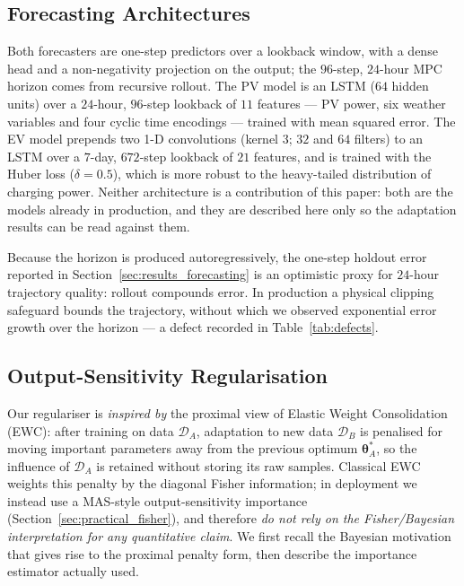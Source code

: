 \documentclass[journal]{IEEEtran}
\newcommand{\params}{\bm{\theta}}
\begin{document}
\subsection{Forecasting Architectures}
\label{sec:architectures}
Both forecasters are one-step predictors over a lookback window, with a dense
head and a non-negativity projection on the output; the $96$-step, $24$-hour
MPC horizon comes from recursive rollout. The PV model is an LSTM ($64$ hidden
units) over a $24$-hour, $96$-step lookback of $11$ features --- PV power, six
weather variables and four cyclic time encodings --- trained with mean squared
error. The EV model prepends two 1-D convolutions (kernel $3$; $32$ and $64$
filters) to an LSTM over a $7$-day, $672$-step lookback of $21$ features, and
is trained with the Huber loss ($\delta = 0.5$), which is more robust to the
heavy-tailed distribution of charging power. Neither architecture is a
contribution of this paper: both are the models already in production, and they
are described here only so the adaptation results can be read against them.

Because the horizon is produced autoregressively, the one-step holdout error
reported in Section~\ref{sec:results_forecasting} is an optimistic proxy for
$24$-hour trajectory quality: rollout compounds error. In production a physical
clipping safeguard bounds the trajectory, without which we observed exponential
error growth over the horizon --- a defect recorded in
Table~\ref{tab:defects}.

\subsection{Output-Sensitivity Regularisation}
\label{sec:ewc}

Our regulariser is \emph{inspired by} the proximal view of Elastic
Weight Consolidation (EWC): after training on data $\mathcal{D}_A$, adaptation
to new data $\mathcal{D}_B$ is penalised for moving important parameters
away from the previous optimum $\params_A^*$, so the influence of
$\mathcal{D}_A$ is retained without storing its raw samples. Classical EWC
weights this penalty by the diagonal Fisher information; in deployment we
instead use a MAS-style output-sensitivity importance
(Section~\ref{sec:practical_fisher}), and therefore \emph{do not rely on
the Fisher/Bayesian interpretation for any quantitative claim}. We first
recall the Bayesian motivation that gives rise to the proximal penalty
form, then describe the importance estimator actually used.
\end{document}
